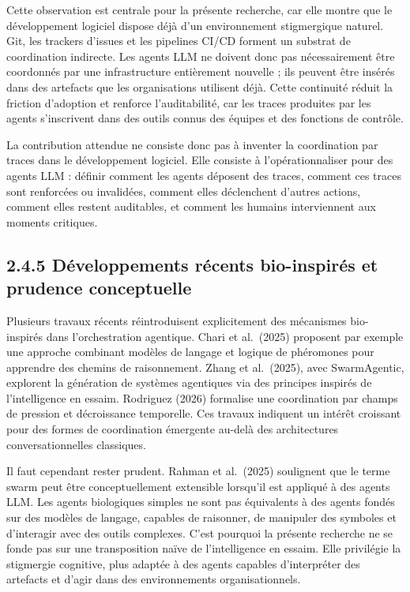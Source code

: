 Cette observation est centrale pour la présente recherche, car elle montre que le développement logiciel dispose déjà d'un environnement stigmergique naturel. Git, les trackers d'issues et les pipelines CI/CD forment un substrat de coordination indirecte. Les agents LLM ne doivent donc pas nécessairement être coordonnés par une infrastructure entièrement nouvelle ; ils peuvent être insérés dans des artefacts que les organisations utilisent déjà. Cette continuité réduit la friction d'adoption et renforce l'auditabilité, car les traces produites par les agents s'inscrivent dans des outils connus des équipes et des fonctions de contrôle.

La contribution attendue ne consiste donc pas à inventer la coordination par traces dans le développement logiciel. Elle consiste à l'opérationnaliser pour des agents LLM : définir comment les agents déposent des traces, comment ces traces sont renforcées ou invalidées, comment elles déclenchent d'autres actions, comment elles restent auditables, et comment les humains interviennent aux moments critiques.

\subsection{2.4.5 Développements récents bio-inspirés et prudence conceptuelle}\label{duxe9veloppements-ruxe9cents-bio-inspiruxe9s-et-prudence-conceptuelle}

Plusieurs travaux récents réintroduisent explicitement des mécanismes bio-inspirés dans l'orchestration agentique. Chari et al.~(2025) proposent par exemple une approche combinant modèles de langage et logique de phéromones pour apprendre des chemins de raisonnement. Zhang et al.~(2025), avec SwarmAgentic, explorent la génération de systèmes agentiques via des principes inspirés de l'intelligence en essaim. Rodriguez (2026) formalise une coordination par champs de pression et décroissance temporelle. Ces travaux indiquent un intérêt croissant pour des formes de coordination émergente au-delà des architectures conversationnelles classiques.

Il faut cependant rester prudent. Rahman et al.~(2025) soulignent que le terme swarm peut être conceptuellement extensible lorsqu'il est appliqué à des agents LLM. Les agents biologiques simples ne sont pas équivalents à des agents fondés sur des modèles de langage, capables de raisonner, de manipuler des symboles et d'interagir avec des outils complexes. C'est pourquoi la présente recherche ne se fonde pas sur une transposition naïve de l'intelligence en essaim. Elle privilégie la stigmergie cognitive, plus adaptée à des agents capables d'interpréter des artefacts et d'agir dans des environnements organisationnels.

